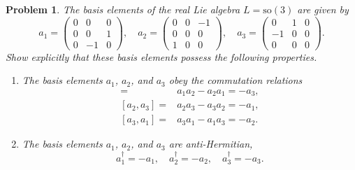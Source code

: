 \documentclass[UTF8,10pt,a4paper]{article}
\theoremstyle{Problem}
\newtheorem{prob}{Problem}
\theoremstyle{Solution}
\begin{document}
\thispagestyle{FirstPageStyle}
\begin{prob}
    The basis elements of the real Lie algebra $L=\text{so}(3)$ are given by
    \[
        a_1=\left(\begin{matrix}
            0&0&0\\
            0&0&1\\
            0&-1&0
        \end{matrix}\right),\quad a_2=\left(\begin{matrix}
            0&0&-1\\
            0&0&0\\
            1&0&0
        \end{matrix}\right),\quad a_3=\left(\begin{matrix}
            0&1&0\\
            -1&0&0\\
            0&0&0
        \end{matrix}\right).
    \]
    Show explicitly that these basis elements possess the following properties.
    \begin{enumerate}
        \item[(a)] The basis elements $a_1$, $a_2$, and $a_3$ obey the commutation relations
        \begin{align*}
            [a_1,a_2]=&a_1a_2-a_2a_1=-a_3,\\
            [a_2,a_3]=&a_2a_3-a_3a_2=-a_1,\\
            [a_3,a_1]=&a_3a_1-a_1a_3=-a_2.
        \end{align*}
        \item[(b)] The basis elements $a_1$, $a_2$, and $a_3$ are anti-Hermitian,
        \[
            a_1^{\dagger}=-a_1,\quad a_2^{\dagger}=-a_2,\quad a_3^{\dagger}=-a_3.
        \]
    \end{enumerate}
\end{prob}
\end{document}
